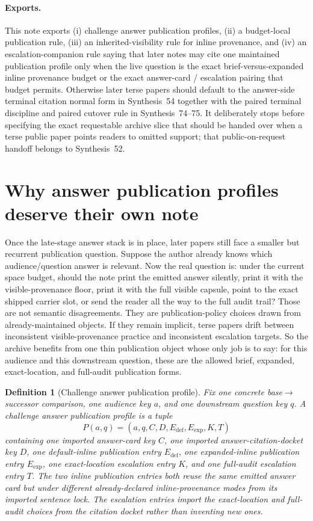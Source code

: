 \documentclass[11pt]{article}
\newtheorem{definition}{Definition}
\begin{document}
\paragraph{Exports.}
This note exports (i) challenge answer publication profiles, (ii) a budget-local publication rule, (iii) an inherited-visibility rule for inline provenance, and (iv) an escalation-companion rule saying that later notes may cite one maintained publication profile only when the live question is the exact brief-versus-expanded inline provenance budget or the exact answer-card / escalation pairing that budget permits. Otherwise later terse papers should default to the answer-side terminal citation normal form in Synthesis~54 together with the paired terminal discipline and paired cutover rule in Synthesis~74--75. It deliberately stops before specifying the exact requestable archive slice that should be handed over when a terse public paper points readers to omitted support; that public-on-request handoff belongs to Synthesis~52.\cite{series:challengeanswerreviewmenus,series:pairedterminalcitationdiscipline,series:pairedterminalcutoverrules}

\section{Why answer publication profiles deserve their own note}
Once the late-stage answer stack is in place, later papers still face a smaller but recurrent publication question.
Suppose the author already knows which audience/question answer is relevant.
Now the real question is: under the current space budget, should the note print the emitted answer silently, print it with the visible-provenance floor, print it with the full visible capsule, point to the exact shipped carrier slot, or send the reader all the way to the full audit trail?
Those are not semantic disagreements.
They are publication-policy choices drawn from already-maintained objects.
If they remain implicit, terse papers drift between inconsistent visible-provenance practice and inconsistent escalation targets.
So the archive benefits from one thin publication object whose only job is to say: for this audience and this downstream question, these are the allowed brief, expanded, exact-location, and full-audit publication forms.

\begin{definition}[Challenge answer publication profile]
Fix one concrete base$\to$successor comparison, one audience key $a$, and one downstream question key $q$.
A \emph{challenge answer publication profile} is a tuple
\[
P(a,q)=(a,q,C,D,E_{\mathrm{def}},E_{\mathrm{exp}},K,T)
\]
containing one imported answer-card key $C$, one imported answer-citation-docket key $D$, one default-inline publication entry $E_{\mathrm{def}}$, one expanded-inline publication entry $E_{\mathrm{exp}}$, one exact-location escalation entry $K$, and one full-audit escalation entry $T$.
The two inline publication entries both reuse the same emitted answer card but under different already-declared inline-provenance modes from its imported sentence lock.
The escalation entries import the exact-location and full-audit choices from the citation docket rather than inventing new ones.
\end{definition}
\end{document}
